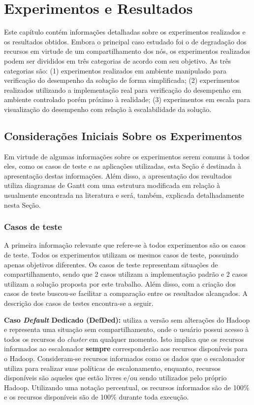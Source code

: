\chapter{Experimentos e Resultados}
\label{chap:ExpRes}
Este capítulo contém informações detalhadas sobre os experimentos realizados e os resultados obtidos. Embora o principal caso estudado foi o de degradação dos recursos em virtude de um compartilhamento dos nós, os experimentos realizados podem ser divididos em três categorias de acordo com seu objetivo. As três categorias são: (1) experimentos realizados em ambiente manipulado para verificação do desempenho da solução de forma simplificada; (2) experimentos realizados utilizando a implementação real para verificação do desempenho em ambiente controlado porém próximo à realidade; (3) experimentos em escala para visualização do desempenho com relação à escalabilidade da solução.

\section{Considerações Iniciais Sobre os Experimentos}
Em virtude de algumas informações sobre os experimentos serem comuns à todos eles, como os casos de teste e as aplicações utilizadas, esta Seção é destinada à apresentação destas informações. Além disso, a apresentação dos resultados utiliza diagramas de Gantt com uma estrutura modificada em relação à usualmente encontrada na literatura e será, também, explicada detalhadamente nesta Seção.

\subsection{Casos de teste}
\label{sec:casosteste}
A primeira informação relevante que refere-se à todos experimentos são os casos de teste. Todos os experimentos utilizam os mesmos casos de teste, possuindo apenas objetivos diferentes. Os casos de teste representam situações de compartilhamento, sendo que 2 casos utilizam a implementação padrão e 2 casos utilizam a solução proposta por este trabalho. Além disso, com a criação dos casos de teste buscou-se facilitar a comparação entre os resultados alcançados. A descrição dos casos de testes encontra-se a seguir.

\textbf{Caso \textit{Default} Dedicado (DefDed):} utiliza a versão sem alterações do Hadoop e representa uma situação sem compartilhamento, onde o usuário possui acesso à todos os recursos do \textit{cluster} em qualquer momento. Isto implica que os recursos informados ao escalonador \textbf{sempre} corresponderão aos recursos disponíveis para o Hadoop. Consideram-se recursos informados como os dados que o escalonador utiliza para realizar suas políticas de escalonamento, enquanto, recursos disponíveis são aqueles que estão livres e/ou sendo utilizados pelo próprio Hadoop. Utilizando uma notação percentual, os recursos informados são de 100\% e os recursos disponíveis são de 100\% durante toda execução.

